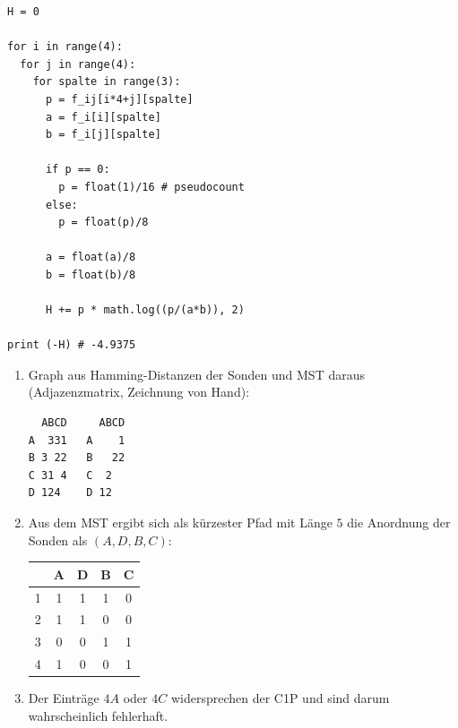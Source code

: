 \documentclass{homework}
\begin{document}
\begin{enumerate}
\begin{itemize}
\begin{verbatim}
H = 0

for i in range(4):
  for j in range(4): 
    for spalte in range(3):
      p = f_ij[i*4+j][spalte]
      a = f_i[i][spalte]
      b = f_i[j][spalte]
      
      if p == 0:
        p = float(1)/16 # pseudocount
      else:
        p = float(p)/8
      
      a = float(a)/8
      b = float(b)/8
      
      H += p * math.log((p/(a*b)), 2)
      
print (-H) # -4.9375
\end{verbatim}	
	
\end{itemize}

\begin{enumerate}

\item Graph aus Hamming-Distanzen der Sonden und MST daraus (Adjazenzmatrix, Zeichnung von Hand):
\begin{verbatim}
  ABCD     ABCD
A  331   A    1
B 3 22   B   22
C 31 4   C  2
D 124    D 12
\end{verbatim}

\item Aus dem MST ergibt sich als kürzester Pfad mit Länge $5$ die Anordnung der Sonden als $(A,D,B,C)$:

\begin{tabular}{l|cccc}
	& A	& D	& B	& C\\\hline
1	& 1	& 1	& 1	& 0\\
2	& 1	& 1	& 0	& 0\\
3	& 0	& 0	& 1	& 1\\
4	& 1	& 0	& 0	& 1
\end{tabular}

\item Der Einträge $4A$ oder $4C$ widersprechen der C1P und sind darum wahrscheinlich fehlerhaft.

\end{enumerate}

\end{enumerate}
\end{document}
